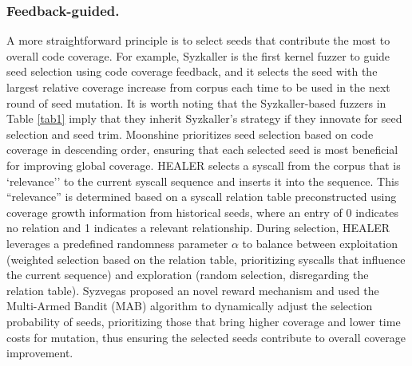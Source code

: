 \subsubsection{Feedback-guided.}
A more straightforward principle is to select seeds that contribute the most to overall code coverage. For example, Syzkaller \cite{Syzkaller} is the first kernel fuzzer to guide seed selection using code coverage feedback, and it selects the seed with the largest relative coverage increase from corpus each time to be used in the next round of seed mutation. It is worth noting that the Syzkaller-based fuzzers in Table \ref{tab1} imply that they inherit Syzkaller's strategy if they innovate for seed selection and seed trim. Moonshine \cite{pailoor2018moonshine} prioritizes seed selection based on code coverage in descending order, ensuring that each selected seed is most beneficial for improving global coverage. HEALER \cite{sun2021healer} selects a syscall from the corpus that is `relevance'' to the current syscall sequence and inserts it into the sequence. This ``relevance'' is determined based on a syscall relation table preconstructed using coverage growth information from historical seeds, where an entry of 0 indicates no relation and 1 indicates a relevant relationship. During selection, HEALER leverages a predefined randomness parameter $\alpha$ to balance between exploitation (weighted selection based on the relation table, prioritizing syscalls that influence the current sequence) and exploration (random selection, disregarding the relation table). Syzvegas \cite{wang2021syzvegas} proposed an novel reward mechanism and used the Multi-Armed Bandit (MAB) algorithm to dynamically adjust the selection probability of seeds, prioritizing those that bring higher coverage and lower time costs for mutation, thus ensuring the selected seeds contribute to overall coverage improvement. 

